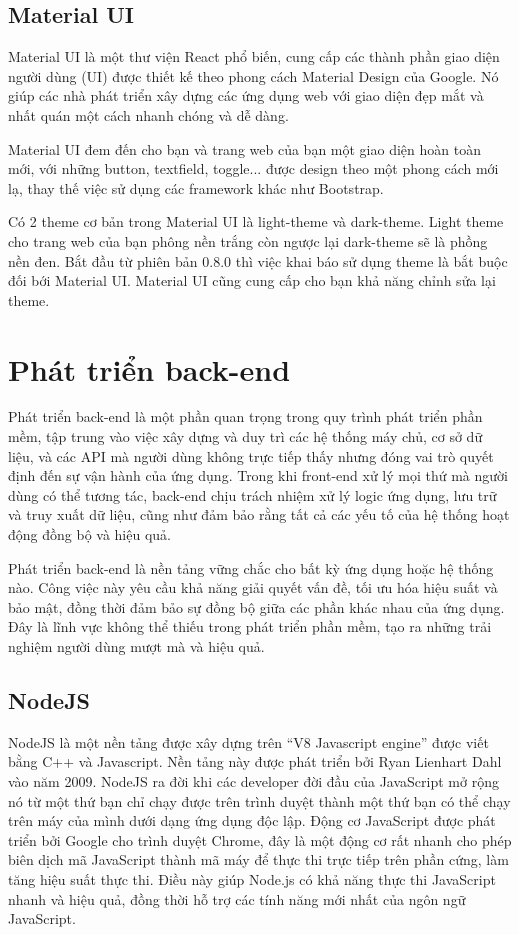 \subsection{Material UI}
Material UI là một thư viện React phổ biến, cung cấp các thành phần giao diện người dùng (UI) được thiết kế theo phong cách Material Design của Google. Nó giúp các nhà phát triển xây dựng các ứng dụng web với giao diện đẹp mắt và nhất quán một cách nhanh chóng và dễ dàng.

Material UI đem đến cho bạn và trang web của bạn một giao diện hoàn toàn mới, với những button, textfield, toggle... được design theo một phong cách mới lạ, thay thế việc sử dụng các framework khác như Bootstrap.

Có 2 theme cơ bản trong Material UI là light-theme và dark-theme. Light theme cho trang web của bạn phông nền trắng còn ngược lại dark-theme sẽ là phồng nền đen. Bắt đầu từ phiên bản 0.8.0 thì việc khai báo sử dụng theme là bắt buộc đối bới Material UI. Material UI cũng cung cấp cho bạn khả năng chỉnh sửa lại theme.

\section{Phát triển back-end}
Phát triển back-end là một phần quan trọng trong quy trình phát triển phần mềm, tập trung vào việc xây dựng và duy trì các hệ thống máy chủ, cơ sở dữ liệu, và các API mà người dùng không trực tiếp thấy nhưng đóng vai trò quyết định đến sự vận hành của ứng dụng. Trong khi front-end xử lý mọi thứ mà người dùng có thể tương tác, back-end chịu trách nhiệm xử lý logic ứng dụng, lưu trữ và truy xuất dữ liệu, cũng như đảm bảo rằng tất cả các yếu tố của hệ thống hoạt động đồng bộ và hiệu quả.

Phát triển back-end là nền tảng vững chắc cho bất kỳ ứng dụng hoặc hệ thống nào. Công việc này yêu cầu khả năng giải quyết vấn đề, tối ưu hóa hiệu suất và bảo mật, đồng thời đảm bảo sự đồng bộ giữa các phần khác nhau của ứng dụng. Đây là lĩnh vực không thể thiếu trong phát triển phần mềm, tạo ra những trải nghiệm người dùng mượt mà và hiệu quả.

\subsection{NodeJS}
NodeJS là một nền tảng được xây dựng trên “V8 Javascript engine” được viết bằng C++ và Javascript. Nền tảng này được phát triển bởi Ryan Lienhart Dahl vào năm 2009. NodeJS ra đời khi các developer đời đầu của JavaScript mở rộng nó từ một thứ bạn chỉ chạy được trên trình duyệt thành một thứ bạn có thể chạy trên máy của mình dưới dạng ứng dụng độc lập. Động cơ JavaScript được phát triển bởi Google cho trình duyệt Chrome, đây là một động cơ rất nhanh cho phép biên dịch mã JavaScript thành mã máy để thực thi trực tiếp trên phần cứng, làm tăng hiệu suất thực thi. Điều này giúp Node.js có khả năng thực thi JavaScript nhanh và hiệu quả, đồng thời hỗ trợ các tính năng mới nhất của ngôn ngữ JavaScript.

